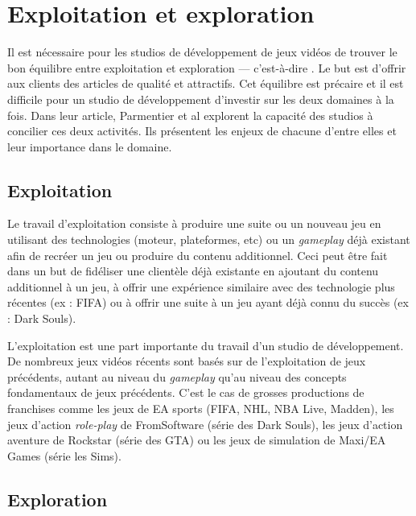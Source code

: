 \section{Exploitation et exploration}
Il est nécessaire pour les studios de développement de jeux vidéos de trouver le bon équilibre entre exploitation et exploration --- c'est-\`a-dire . Le but est d'offrir aux clients des articles de qualité et attractifs. Cet équilibre est précaire et il est difficile pour un studio de développement d'investir sur les deux domaines à la fois. Dans leur article, Parmentier et al \cite{ParmentierGuy2009Iecd} explorent la capacité des studios à concilier ces deux activités. Ils présentent les enjeux de chacune d'entre elles et leur importance dans le domaine.



\subsection{Exploitation}


Le travail d'exploitation consiste à produire une suite ou un nouveau jeu en utilisant des technologies (moteur, plateformes, etc) ou un \emph{gameplay} déjà existant afin de recréer un jeu ou produire du contenu additionnel. Ceci peut être fait dans un but de fidéliser une clientèle déjà existante en ajoutant du contenu additionnel à un jeu, à offrir une expérience similaire avec des technologie plus récentes (ex : FIFA) ou à offrir une suite à un jeu ayant déjà connu du succès (ex : Dark Souls).

L'exploitation est une part importante du travail d'un studio de développement. De nombreux jeux vidéos récents sont basés sur de l'exploitation de jeux précédents, autant au niveau du \emph{gameplay} qu'au niveau des concepts fondamentaux de jeux précédents. C'est le cas de grosses productions de franchises comme les jeux de EA sports (FIFA, NHL, NBA Live, Madden), les jeux d'action \emph{role-play} de FromSoftware (série des Dark Souls), les jeux d'action aventure de Rockstar (série des GTA) ou les jeux de simulation de Maxi/EA Games (série les Sims). 

\subsection{Exploration}

